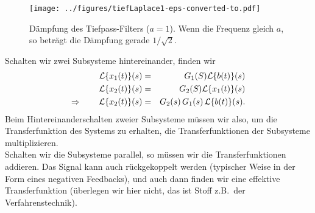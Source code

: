  \begin{figure}[htb]
 \begin{center}
 \texttt{[image: ../figures/tiefLaplace1-eps-converted-to.pdf]}
 \end{center}
 \caption{D\"ampfung des Tiefpass-Filters ($a=1$). Wenn die Frequenz gleich $a$, 
       so betr\"agt die D\"ampfung gerade $1/\sqrt{2}$. }\label{deampf}
 \end{figure}


Schalten wir zwei Subsysteme hintereinander, finden wir
\begin{eqnarray*}
{\cal L}\{x_1(t)\}(s) &=& G_1(S) {\cal L}\{b(t)\}(s) \\
{\cal L}\{x_2(t)\}(s) &=& G_2(S) {\cal L}\{x_1(t)\}(s) \\
\Rightarrow\qquad {\cal L}\{x_2(t)\}(s) &=& G_2(s)\, G_1(s)\, {\cal L}\{b(t)\}(s).
\end{eqnarray*}
Beim Hintereinanderschalten zweier Subsysteme m\"ussen wir also, um die Transferfunktion
des Systems zu erhalten, die Transferfunktionen der Subsysteme multiplizieren. \\
Schalten wir die Subsysteme parallel, so m\"ussen wir 
die Transferfunktionen addieren. Das Signal kann auch r\"uckgekoppelt werden 
(typischer Weise in der Form eines negativen Feedbacks), und auch dann finden
wir eine effektive Transferfunktion (\"uberlegen wir hier nicht, das 
ist Stoff z.B.\ der Verfahrenstechnik).


\par\bigskip


\begin{auf}\chd\label{lpaplaceAuf9}

\end{auf}

\begin{auf}\che\label{lpaplaceAuf10}

\end{auf}
